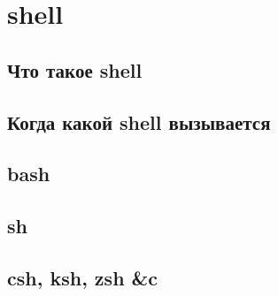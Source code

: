 \section{shell}
\subsection{Что такое shell}
\subsection{Когда какой shell вызывается}
\subsection{bash}
\subsection{sh}
\subsection{csh, ksh, zsh \&c}
\newpage